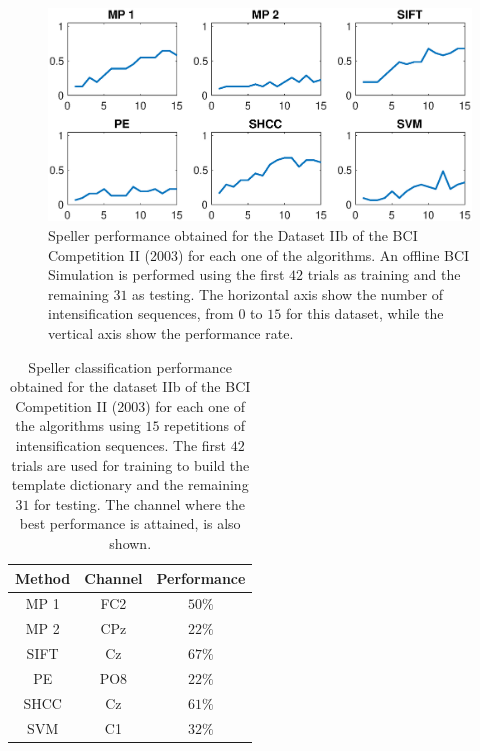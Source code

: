 \documentclass[brainsci,article,submit,moreauthors,pdftex,10pt,a4paper]{mdpi}
\begin{document}
\begin{figure}[H]
\centering
\includegraphics[width=15cm]{images/PerformanceBCICompetition.eps}
\caption{Speller performance obtained for the Dataset IIb of the BCI Competition II (2003) for each one of the algorithms.  An offline BCI Simulation is performed using the first $42$ trials as training and the remaining $31$ as testing.  The horizontal axis show the number of intensification sequences, from $0$ to $15$ for this dataset, while the vertical axis show the performance rate.}
\label{fig:performancebcicompetition}
\end{figure}


\begin{table}[H]
\caption{Speller classification performance obtained for the dataset IIb of the BCI Competition II (2003) for each one of the algorithms using $15$ repetitions of intensification sequences. The first $42$ trials are used for training to build the template dictionary and the remaining $31$ for testing. The channel where the best performance is attained, is also shown. }
\centering
\begin{tabular}{ccc}
\toprule
\textbf{Method}	& \textbf{Channel} &  \textbf{Performance} \\
\midrule
MP 1 & FC2  & $50\%$ \\
MP 2 & CPz & $22\%$ \\
SIFT  & Cz & $67\%$ \\
PE     & PO8 & $22\%$ \\
SHCC & Cz & $61\%$ \\
SVM     & C1  & $32\%$ \\
\bottomrule
\end{tabular}
\label{tab:bcicompetitionresults}
\end{table}
\end{document}

